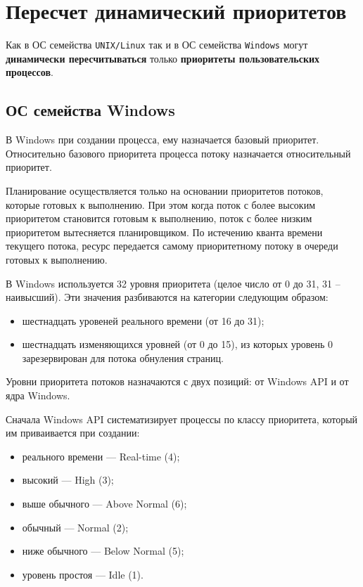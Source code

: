 \chapter{Пересчет динамический приоритетов}

Как в ОС семейства \texttt{UNIX/Linux} так и в ОС семейства \texttt{Windows}
могут \textbf{динамически пересчитываться} только \textbf{приоритеты
пользовательских процессов}.

\section{ОС семейства Windows}

В Windows при создании процесса, ему назначается базовый приоритет.
Относительно базового приоритета процесса потоку назначается относительный
приоритет. 

Планирование осуществляется только на основании приоритетов потоков, которые
готовых к выполнению. При этом когда поток с более высоким приоритетом
становится готовым к выполнению, поток с более низким приоритетом вытесняется
планировщиком. По истечению кванта времени текущего потока, ресурс передается
самому приоритетному потоку в очереди готовых к выполнению.

В Windows используется 32 уровня приоритета (целое число от 0 до 31, 31 --
наивысший). Эти значения разбиваются на категории следующим образом:
\begin{itemize}[left=\parindent]
    \item шестнадцать уровеней реального времени (от 16 до 31);
    \item шестнадцать изменяющихся уровней (от 0 до 15), из которых уровень 0
          зарезервирован для потока обнуления страниц.
\end{itemize}

Уровни приоритета потоков назначаются с двух позиций: от Windows API и от ядра
Windows.

Сначала Windows API систематизирует процессы по классу приоритета, который им
приваивается при создании:
\begin{itemize}[left=\parindent]
    \item реального времени — Real-time (4);
    \item высокий — High (3);
    \item выше обычного — Above Normal (6);
    \item обычный — Normal (2);
    \item ниже обычного — Below Normal (5);
    \item уровень простоя — Idle (1).
\end{itemize}

